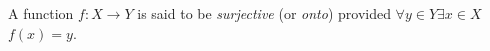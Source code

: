\guard



\begin{defn}
\label{defn:surjective}
  A function $f:X\to Y$ is said to be \emph{surjective} (or \emph{onto}) provided $\forall y\in Y\exists x\in X$ $f(x)=y$.
\end{defn}

